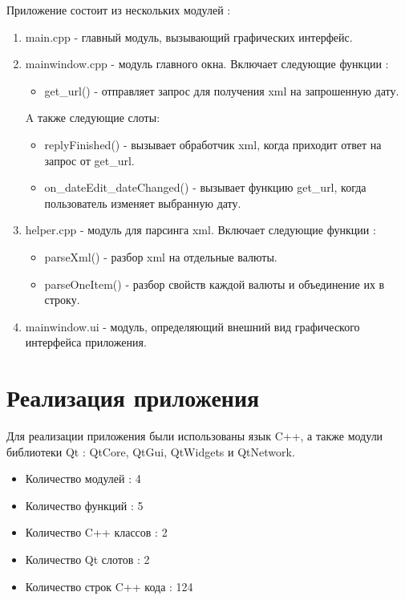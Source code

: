 \documentclass[a4paper,12pt]{article}
\begin{document}
Приложение состоит из нескольких модулей : 
\begin{enumerate}
    \item main.cpp - главный модуль, вызывающий графических интерфейс.
    \item mainwindow.cpp - модуль главного окна. Включает следующие функции :
    \begin{itemize}
        \item get\_url() - отправляет запрос для получения xml на запрошенную дату.
    \end{itemize}
    A также следующие слоты:
    \begin{itemize}
        \item replyFinished() - вызывает обработчик xml, когда приходит ответ на запрос от get\_url.
        \item on\_dateEdit\_dateChanged() - вызывает функцию get\_url, когда пользователь изменяет выбранную дату.
    \end{itemize}
    \item helper.cpp - модуль для парсинга xml. Включает следующие функции :
    \begin{itemize}
        \item parseXml() - разбор xml на отдельные валюты.
        \item parseOneItem() - разбор свойств каждой валюты и объединение их в строку.
    \end{itemize}
    \item mainwindow.ui - модуль, определяющий внешний вид графического интерфейса приложения.
\end{enumerate}


\newpage
\section{Реализация приложения}

Для реализации приложения были использованы язык C++, а также модули библиотеки Qt : QtCore, QtGui, QtWidgets и QtNetwork. \\
\begin{itemize}
    \item Количество модулей : 4
    \item Количество функций : 5
    \item Количество C++ классов : 2
    \item Количество Qt слотов : 2
    \item Количество строк C++ кода : 124
\end{itemize}
\end{document}

